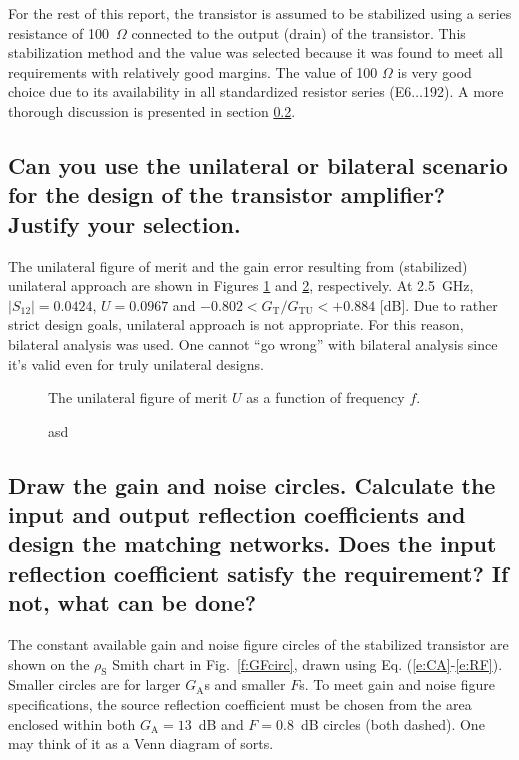 \documentclass[a4paper, 12pt]{article}
\begin{document}
For the rest of this report, the transistor is assumed to be stabilized using a series resistance 
of 100~$\Omega$ connected to the output (drain) of the transistor. This stabilization method and 
the value was selected because it was found to meet all requirements with relatively good margins. 
The value of 100 $\Omega$ is very good choice due to its availability in all standardized resistor 
series (E6$\ldots$192). A more thorough discussion is presented in section \ref{s:gf}.


\subsection{Can you use the unilateral or bilateral scenario for the design of the transistor amplifier? 
Justify your selection.}

The unilateral figure of merit and the gain error resulting from (stabilized) unilateral approach are 
shown in Figures \ref{f:U} and \ref{f:DeltaG}, respectively. At 2.5~GHz, $|S_{12}| = 0.0424$, $U = 0.0967$ 
and $-0.802 < G_\mathrm{T}/G_\mathrm{TU} < +0.884$ [dB]. Due to rather strict design goals, unilateral 
approach is not appropriate. For this reason, bilateral analysis was used. One cannot ``go wrong'' with 
bilateral analysis since it's valid even for truly unilateral designs.

\begin{figure}[!h]
	\begin{center}
		\caption{The unilateral figure of merit $U$ as a function of frequency $f$.}
		\label{f:U}
	\end{center}
\end{figure}

\begin{figure}[!h]
	\begin{center}
		\caption{asd}
		\label{f:DeltaG}
	\end{center}
\end{figure}


\newpage
\subsection{Draw the gain and noise circles. Calculate the input and output reflection 
	coefficients and design the matching networks. Does the input reflection coefficient 
	satisfy the requirement? If not, what can be done?}
\label{s:gf}

The constant available gain and noise figure circles of the stabilized transistor are shown 
on the $\rho_\mathrm{S}$ Smith chart in Fig.~\ref{f:GFcirc}, drawn using Eq. (\ref{e:CA}-\ref{e:RF}). 
Smaller circles are for larger $G_\mathrm{A}$s and smaller $F$s. To meet gain and noise figure 
specifications, the source reflection coefficient must be chosen from the area enclosed within 
both $G_\mathrm{A} = 13$~dB and $F = 0.8$~dB circles (both dashed). One may think of it as a 
Venn diagram of sorts. 
\end{document}
